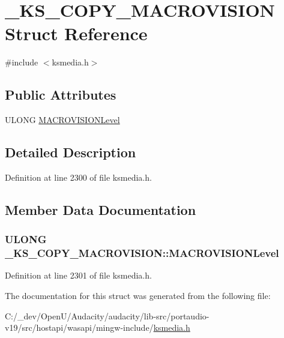 \hypertarget{struct___k_s___c_o_p_y___m_a_c_r_o_v_i_s_i_o_n}{}\section{\+\_\+\+K\+S\+\_\+\+C\+O\+P\+Y\+\_\+\+M\+A\+C\+R\+O\+V\+I\+S\+I\+ON Struct Reference}
\label{struct___k_s___c_o_p_y___m_a_c_r_o_v_i_s_i_o_n}


{\ttfamily \#include $<$ksmedia.\+h$>$}

\subsection*{Public Attributes}
\begin{DoxyCompactItemize}
\item 
U\+L\+O\+NG \hyperlink{struct___k_s___c_o_p_y___m_a_c_r_o_v_i_s_i_o_n_a66adf201369198e5326ddc23c519a579}{M\+A\+C\+R\+O\+V\+I\+S\+I\+O\+N\+Level}
\end{DoxyCompactItemize}


\subsection{Detailed Description}


Definition at line 2300 of file ksmedia.\+h.



\subsection{Member Data Documentation}
\subsubsection[{\texorpdfstring{M\+A\+C\+R\+O\+V\+I\+S\+I\+O\+N\+Level}{MACROVISIONLevel}}]{\setlength{\rightskip}{0pt plus 5cm}U\+L\+O\+NG \+\_\+\+K\+S\+\_\+\+C\+O\+P\+Y\+\_\+\+M\+A\+C\+R\+O\+V\+I\+S\+I\+O\+N\+::\+M\+A\+C\+R\+O\+V\+I\+S\+I\+O\+N\+Level}\hypertarget{struct___k_s___c_o_p_y___m_a_c_r_o_v_i_s_i_o_n_a66adf201369198e5326ddc23c519a579}{}\label{struct___k_s___c_o_p_y___m_a_c_r_o_v_i_s_i_o_n_a66adf201369198e5326ddc23c519a579}


Definition at line 2301 of file ksmedia.\+h.



The documentation for this struct was generated from the following file\+:\begin{DoxyCompactItemize}
\item 
C\+:/\+\_\+dev/\+Open\+U/\+Audacity/audacity/lib-\/src/portaudio-\/v19/src/hostapi/wasapi/mingw-\/include/\hyperlink{ksmedia_8h}{ksmedia.\+h}\end{DoxyCompactItemize}
